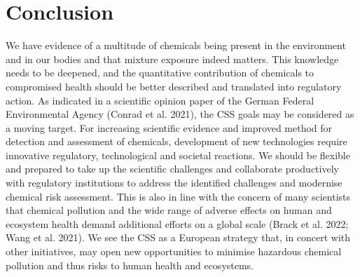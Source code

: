 \chapter{Conclusion}

We have evidence of a multitude of chemicals being present in the environment and in our bodies and that mixture exposure indeed matters. This knowledge needs to be deepened, and the quantitative contribution of chemicals to compromised health should be better described and translated into regulatory action. As indicated in a scientific opinion paper of the German Federal Environmental Agency (Conrad et al. 2021), the CSS goals may be considered as a moving target. For increasing scientific evidence and improved method for detection and assessment of chemicals, development of new technologies require innovative regulatory, technological and societal reactions. We should be flexible and prepared to take up the scientific challenges and collaborate productively with regulatory institutions to address the identified challenges and modernise chemical risk assessment. This is also in line with the concern of many scientists that chemical pollution and the wide range of adverse effects on human and ecosystem health demand additional efforts on a global scale (Brack et al. 2022; Wang et al. 2021). We see the CSS as a European strategy that, in concert with other initiatives, may open new opportunities to minimise hazardous chemical pollution and thus risks to human health and ecosystems.